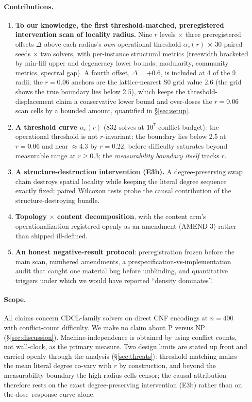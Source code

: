 \documentclass[pdflatex,sn-basic,Numbered]{sn-jnl}
\newcommand{\ac}[1]{\ensuremath{\alpha_c(#1)}}
\begin{document}
\paragraph{Contributions.}
\begin{enumerate}
\item \textbf{To our knowledge, the first threshold-matched, preregistered
intervention scan of locality radius.}
Nine $r$ levels $\times$ three preregistered offsets $\Delta$ above each radius's
\emph{own} operational threshold $\ac{r}$ $\times$ 30 paired seeds $\times$ two
solvers, with per-instance structural metrics (treewidth bracketed by min-fill
upper and degeneracy lower bounds; modularity, community metrics, spectral
gap). A fourth offset, $\Delta{=}{+}0.6$, is included at 4 of the 9 radii; the
$r{=}0.06$ anchors are the lattice-nearest S0 grid value 2.6 (the grid shows
the true boundary lies below 2.5), which keeps the threshold-displacement
claim a conservative lower bound and over-doses the $r{=}0.06$ scan cells by
a bounded amount, quantified in \S\ref{sec:setup}.
\item \textbf{A threshold curve $\ac{r}$} (832 solves at $10^7$-conflict
budget): the operational threshold is not $r$-invariant: the boundary lies below
2.5 at $r=0.06$ and near ${\approx}4.3$ by $r=0.22$, before difficulty
saturates beyond measurable range at $r\ge0.3$; the \emph{measurability
boundary itself} tracks $r$.
\item \textbf{A structure-destruction intervention (E3b).} A degree-preserving
swap chain destroys spatial locality while keeping the literal degree sequence
exactly fixed; paired Wilcoxon tests probe the causal contribution of the
structure-destroying bundle.
\item \textbf{Topology $\times$ content decomposition}, with the content arm's
operationalization registered openly as an amendment (AMEND-3) rather than
shipped ill-defined.
\item \textbf{An honest negative-result protocol}: preregistration frozen
before the main scan, numbered amendments, a prespecification-vs-implementation
audit that caught one material bug before unblinding, and quantitative
triggers under which we would have reported ``density dominates''.
\end{enumerate}

\paragraph{Scope.}
All claims concern CDCL-family solvers on direct CNF encodings at $n=400$ with
conflict-count difficulty. We make no claim about \textsc{P} versus
\textsc{NP} (\S\ref{sec:discussion}). Machine-independence is obtained by
using conflict counts, not wall-clock, as the primary measure. Two design
limits are stated up front and carried openly through the analysis
(\S\ref{sec:threats}): threshold matching makes the mean literal degree
co-vary with $r$ by construction, and beyond the measurability boundary the
high-radius cells censor; the causal attribution therefore rests on the
exact degree-preserving intervention (E3b) rather than on the dose--response
curve alone.
\end{document}

